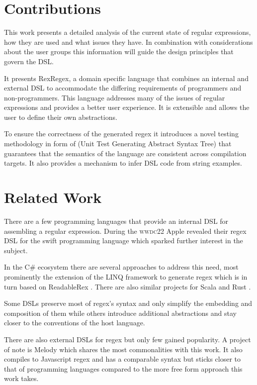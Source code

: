 \section{Contributions}

This work presents a detailed analysis of the current state of regular expressions, how they are used and what issues they have. In combination with considerations about the user groups this information will guide the design principles that govern the DSL. 

It presents RexRegex, a domain specific language that combines an internal and external DSL to accommodate the differing requirements of programmers and non-programmers. This language addresses many of the issues of regular expressions and provides a better user experience. It is extensible and allows the user to define their own abstractions.

To ensure the correctness of the generated regex it introduces a novel testing methodology in form of \utgast{} (Unit Test Generating Abstract Syntax Tree) that guarantees that the semantics of the language are consistent across compilation targets. It also provides a mechanism to infer DSL code from string examples.

\section{Related Work} \label{sec:relatedWork}

There are a few programming languages that provide an internal DSL for assembling a regular expression. During the \textsc{wwdc22} Apple revealed their regex DSL for the swift programming language \cite{RegexDslSwift} which sparked further interest in the subject.

In the C\# ecosystem there are several approaches to address this need, most prominently the extension of the LINQ \cite{linq} framework to generate regex \cite{RegexDslLinq} which is in turn based on ReadableRex \cite{RegexDslReadableRex}. There are also similar projects for Scala \cite{RegexDslRel} and Rust \cite{RegexDslPomsky}. 

Some DSLs preserve most of regex's syntax and only simplify the embedding and composition of them while others introduce additional abstractions and stay closer to the conventions of the host language.

There are also external DSLs for regex but only few gained popularity. A project of note is Melody \cite{RegexDslMelody} which shares the most commonalities with this work. It also compiles to Javascript regex and has a comparable syntax but sticks closer to that of programming languages compared to the more free form approach this work takes.

